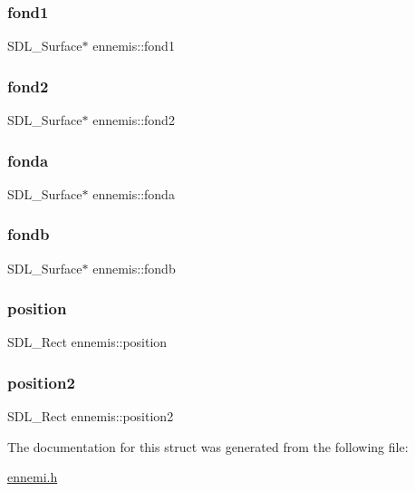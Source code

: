 \subsubsection{\texorpdfstring{fond1}{fond1}}
{\footnotesize\ttfamily S\+D\+L\+\_\+\+Surface$\ast$ ennemis\+::fond1}

\mbox{\label{structennemis_a7cdce135302cefeedce69637c561ca87}} 
\subsubsection{\texorpdfstring{fond2}{fond2}}
{\footnotesize\ttfamily S\+D\+L\+\_\+\+Surface$\ast$ ennemis\+::fond2}

\mbox{\label{structennemis_a0656bf1f2a05bd147d373d7eaa3f4285}} 
\subsubsection{\texorpdfstring{fonda}{fonda}}
{\footnotesize\ttfamily S\+D\+L\+\_\+\+Surface$\ast$ ennemis\+::fonda}

\mbox{\label{structennemis_aaef083b31ba478455bcbd16ed7235efb}} 
\subsubsection{\texorpdfstring{fondb}{fondb}}
{\footnotesize\ttfamily S\+D\+L\+\_\+\+Surface$\ast$ ennemis\+::fondb}

\mbox{\label{structennemis_a3e8a9864c41c217f29e8fa94c3323414}} 
\subsubsection{\texorpdfstring{position}{position}}
{\footnotesize\ttfamily S\+D\+L\+\_\+\+Rect ennemis\+::position}

\mbox{\label{structennemis_a25ac4c539f00f1d72a98164bbbe17f18}} 
\subsubsection{\texorpdfstring{position2}{position2}}
{\footnotesize\ttfamily S\+D\+L\+\_\+\+Rect ennemis\+::position2}



The documentation for this struct was generated from the following file\+:\begin{DoxyCompactItemize}
\item 
\hyperlink{ennemi_8h}{ennemi.\+h}\end{DoxyCompactItemize}
